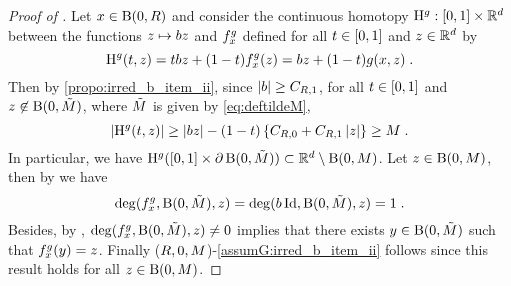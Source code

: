 \begin{proof}[Proof of ]
  Let $x \in \operatorname{B}(0,R)$ and consider the continuous homotopy $\mathrm{H}^g : \left[0,1\right]
\times \mathbb{R}^d$ between the functions $z \mapsto b z$ and $f^{g}_x$ defined for all
$t \in \left[0,1\right]$ and $z \in \mathbb{R}^d$ by
\begin{equation}
  \mathrm{H}^g(t,z) = t b z + (1-t)f^{g}_x(z) = b z + (1-t)  g(x,z)  \;.
\end{equation}
Then by \ref{propo:irred_b_item_ii}, since $\left\vert b \right\vert \geq C_{R,1} $, for all $t\in \left[0,1\right]$ and $z \not \in
\operatorname{B}(0,\tilde{M})$, where $\tilde{M}$ is given by \eqref{eq:deftildeM},
\begin{equation}
   \left\vert \mathrm{H}^g(t,z) \right\vert \geq  \left\vert b z \right\vert -(1-t)\left\lbrace C_{R,0} +C_{R,1} \left\vert z \right\vert  \right\rbrace \geq M \;.
\end{equation}
In particular, we have $\mathrm{H}^g(\left[0,1\right] \times \partial
\operatorname{B}(0,\tilde{M})) \subset \mathbb{R}^d \setminus \operatorname{B}(0,M)$. Let
$z \in \operatorname{B}(0,M)$, then by
 we have
\begin{equation}
  \deg(f^{g}_x,\operatorname{B}(0,\tilde{M}),z) = \deg(b \operatorname{Id}, \operatorname{B}(0,\tilde{M}),z) = 1 \;.
\end{equation}
Besides, by \cite[Corollary 2.5, Chapter IV]{outerelo:ruiz:2009},
$\deg(f^{g}_x,\operatorname{B}(0,\tilde{M}),z) \not = 0$ implies that there exists
$y \in \operatorname{B}(0,\tilde{M})$ such that $f^{g}_x(y) = z$. Finally ($R,0,M$)-\ref{assumG:irred_b_item_ii} follows since this
result holds for all $z \in \operatorname{B}(0,M)$.
\end{proof}

